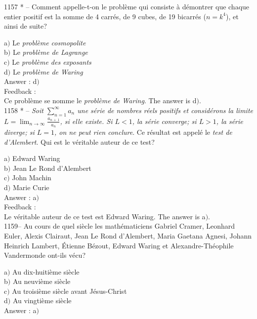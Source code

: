 \documentclass[letterpaper, 12pt]{article}
\begin{document}
1157 * -- Comment appelle-t-on le probl\`eme qui consiste \`a
d\'emontrer que chaque entier positif est la somme de 4 carr\'es, de
9 cubes, de 19 bicarr\'es ($n=k^4$), et ainsi de suite?

a$)$ Le {\sl probl\`eme cosmopolite} \\
b$)$ Le {\sl probl\`eme de Lagrange} \\
c$)$ Le {\sl probl\`eme des exposants} \\
d$)$ Le {\sl probl\`eme de Waring}\\

Answer : d$)$\\

Feedback : \\
Ce probl\`eme se nomme le {\sl probl\`eme de Waring}. The answer is
d$)$.\\

1158 * -- {\sl Soit $\sum_{n=1}^{\infty}a_n$ une s\'erie de nombres
r\'eels positifs et consid\'erons la limite
$L=\lim_{n\to\infty}\frac{a_{n\,+\,1}}{a_n}$, si elle existe. Si
$L<1$, la s\'erie converge; si $L>1$, la s\'erie diverge; si $L=1$,
on ne peut rien conclure}. Ce r\'esultat est appel\'e le {\sl test
de d'Alembert}. Qui est le v\'eritable auteur de ce test?

a$)$ Edward Waring \\
b$)$ Jean Le Rond d'Alembert \\
c$)$ John Machin \\
d$)$ Marie Curie\\

Answer : a$)$\\

Feedback : \\
Le v\'eritable auteur de ce test est Edward Waring. The answer is a$)$.\\

1159-- Au cours de quel si\`ecle les math\'ematiciens Gabriel
Cramer, Leonhard Euler, Alexis Clairaut, Jean Le Rond d'Alembert,
Maria Gaetana Agnesi, Johann Heinrich Lambert, \'Etienne B\'ezout,
Edward Waring et Alexandre-Th\'eophile Vandermonde ont-ils v\'ecu?

a$)$ Au dix-huiti\`eme si\`ecle \\
b$)$ Au neuvi\`eme si\`ecle \\
c$)$ Au troisi\`eme si\`ecle avant J\'esus-Christ \\
d$)$ Au vingti\`eme si\`ecle   \\

Answer : a$)$\\
\end{document}
